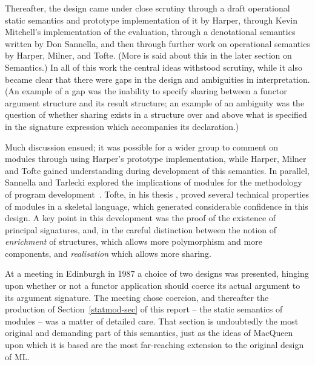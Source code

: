 Thereafter, the design came under close scrutiny through a draft operational
static semantics and prototype implementation of it by Harper, through Kevin
Mitchell's implementation of the evaluation, through a denotational semantics
written by Don Sannella, and then through further work on operational
semantics by Harper, Milner, and Tofte.  (More is said about this in the later
section on Semantics.)  In all of this work the central ideas withstood
scrutiny, while it also became clear that there were gaps in the design and
ambiguities in interpretation.  (An example of a gap was the inability to
specify sharing between a functor argument structure and its result structure;
an example of an ambiguity was the question of whether sharing exists in a
structure over and above what is specified in the signature expression which
accompanies its declaration.)

Much discussion ensued; it was possible for a wider group to comment on
modules through using Harper's prototype implementation, while Harper, Milner
and Tofte gained understanding during development of this semantics.  In
parallel, Sannella and Tarlecki explored the implications of modules for the
methodology of program development~\cite{ST}.  Tofte, in his thesis
\cite{tofte88}, proved several technical properties of modules in a skeletal
language, which generated considerable confidence in this design. A key point
in this development was the proof of the existence of principal signatures,
and, in the careful distinction between the notion of {\it enrichment} of
structures, which allows more polymorphism and more components, and {\it
realisation} which allows more sharing.

At a meeting in Edinburgh in 1987 a choice of two designs was presented,
hinging upon whether or not a functor application should coerce its actual
argument to its argument signature.  The meeting chose coercion, and
thereafter the production of Section~\ref{statmod-sec} of this report -- the
static semantics of modules -- was a matter of detailed care.  That section is
undoubtedly the most original and demanding part of this semantics, just as
the ideas of MacQueen upon which it is based are the most far-reaching
extension to the original design of ML.

